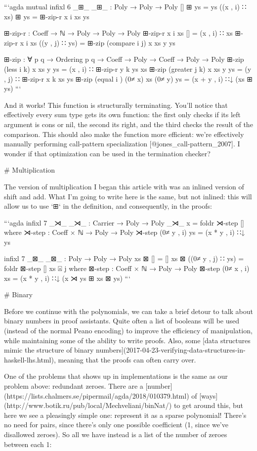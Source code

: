 \documentclass{article}
\begin{document}
```agda
mutual
  infixl 6 _⊞_
  _⊞_ : Poly → Poly → Poly
  [] ⊞ ys = ys
  ((x , i) ∷ xs) ⊞ ys = ⊞-zip-r x i xs ys

  ⊞-zip-r : Coeff → ℕ → Poly → Poly → Poly
  ⊞-zip-r x i xs [] = (x , i) ∷ xs
  ⊞-zip-r x i xs ((y , j) ∷ ys) = ⊞-zip (compare i j) x xs y ys

  ⊞-zip : ∀ {p q}
        → Ordering p q
        → Coeff
        → Poly
        → Coeff
        → Poly
        → Poly
  ⊞-zip (less    i k) x xs y ys = (x , i) ∷ ⊞-zip-r y k ys xs
  ⊞-zip (greater j k) x xs y ys = (y , j) ∷ ⊞-zip-r x k xs ys
  ⊞-zip (equal   i  ) (0≠ x) xs (0≠ y) ys =
    (x + y , i) ∷↓ (xs ⊞ ys)
```

And it works! This function is structurally terminating. You'll notice that
effectively every sum type gets its own function: the first only checks if its
left argument is cons or nil, the second its right, and the third checks the
result of the comparison. This should also make the function more efficient:
we're effectively manually performing call-pattern specialization
[@jones_call-pattern_2007]. I wonder if that optimization can be used in the
termination checker?

# Multiplication

The version of multiplication I began this article with was an inlined version
of shift and add. What I'm going to write here is the same, but not inlined:
this will allow us to use `⊞` in the definition, and consequently, in the
proofs:

```agda
infixl 7 _⋊_
_⋊_ : Carrier → Poly → Poly
_⋊_ x = foldr ⋊-step []
  where
  ⋊-step : Coeff × ℕ → Poly → Poly
  ⋊-step (0≠ y , i) ys = (x * y , i) ∷↓ ys

infixl 7 _⊠_
_⊠_ : Poly → Poly → Poly
xs ⊠ [] = []
xs ⊠ ((0≠ y , j) ∷ ys) = foldr ⊠-step [] xs ⍓ j
  where
  ⊠-step : Coeff × ℕ → Poly → Poly
  ⊠-step (0≠ x , i) xs = (x * y , i) ∷↓ (x ⋊ ys ⊞ xs ⊠ ys)
```

# Binary

Before we continue with the polynomials, we can take a brief detour to talk
about binary numbers in proof assistants. Quite often a list of booleans will be
used (instead of the normal Peano encoding) to improve the efficiency of
manipulation, while maintaining some of the ability to write proofs. Also, some
[data structures mimic the structure of binary
numbers](2017-04-23-verifying-data-structures-in-haskell-lhs.html), meaning that
the proofs can often carry over.

One of the problems that shows up in implementations is the same as our problem
above: redundant zeroes. There are a
[number](https://lists.chalmers.se/pipermail/agda/2018/010379.html) of
[ways](http://www.botik.ru/pub/local/Mechveliani/binNat/) to get around this,
but here we see a pleasingly simple one: represent it as a sparse polynomial!
There's no need for pairs, since there's only one possible coefficient (1, since
we've disallowed zeroes). So all we have instead is a list of the number of
zeroes between each 1:
\end{document}
